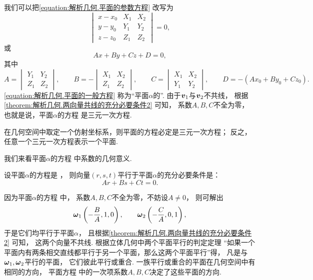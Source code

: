 我们可以把\cref{equation:解析几何.平面的参数方程} 改写为
\begin{equation}
	\begin{vmatrix}
		x - x_0 & X_1 & X_2 \\
		y - y_0 & Y_1 & Y_2 \\
		z - z_0 & Z_1 & Z_2
	\end{vmatrix} = 0,
\end{equation}
或\begin{equation}\label{equation:解析几何.平面的一般方程}
	A x + B y + C z + D = 0,
\end{equation}
其中\[
	A = \begin{vmatrix}
		Y_1 & Y_2 \\
		Z_1 & Z_2
	\end{vmatrix},
	\qquad
	B = -\begin{vmatrix}
		X_1 & X_2 \\
		Z_1 & Z_2
	\end{vmatrix},
	\qquad
	C = \begin{vmatrix}
		X_1 & X_2 \\
		Y_1 & Y_2
	\end{vmatrix},
	\qquad
	D = - (A x_0 + B y_0 + C z_0).
\]
\cref{equation:解析几何.平面的一般方程}
称为“平面\(\alpha\)的”.
由于\(\boldsymbol{v}_1\)与\(\boldsymbol{v}_2\)不共线，
根据\cref{theorem:解析几何.两向量共线的充分必要条件2} 可知，
系数\(A,B,C\)不全为零，
也就是说，平面\(\alpha\)的方程  是三元一次方程.

\begin{theorem}
在几何空间中取定一个仿射坐标系，则平面的方程必定是三元一次方程；
反之，任意一个三元一次方程表示一个平面.
\end{theorem}

我们来看平面\(\alpha\)的方程  中系数的几何意义.

\begin{theorem}
设平面\(\alpha\)的方程是 ，
则向量\((r,s,t)\)平行于平面\(\alpha\)的充分必要条件是：\[
	Ar+Bs+Ct = 0.
\]
\end{theorem}

因为平面\(\alpha\)的方程  中，
系数\(A,B,C\)不全为零，不妨设\(A\neq0\)，
则可解出\[
	\boldsymbol{\omega}_1 \left( -\frac{B}{A},1,0 \right), \qquad
	\boldsymbol{\omega}_2 \left( -\frac{C}{A},0,1 \right),
\]
于是它们均平行于平面\(\alpha\)，
且根据\cref{theorem:解析几何.两向量共线的充分必要条件2} 可知，
这两个向量不共线.
根据立体几何中两个平面平行的判定定理
“如果一个平面内有两条相交直线都平行于另一个平面，那么这两个平面平行”得，
凡是与\(\boldsymbol{\omega}_1,\boldsymbol{\omega}_2\)平行的平面，
它们彼此平行或重合.
一族平行或重合的平面在几何空间中有相同的方向，
平面方程  中的一次项系数\(A,B,C\)决定了这些平面的方向.

